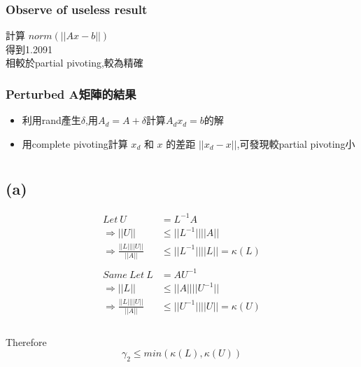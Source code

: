 \documentclass[12pt]{article}
\begin{document}
    \subsubsection*{Observe of useless result}
        計算 $norm(||Ax-b||)$\\
        得到1.2091\\
        相較於partial pivoting,較為精確
    \subsubsection*{Perturbed A矩陣的結果}
        \begin{itemize}
            \item 利用rand產生$\delta$,用$A_d=A+\delta$計算$A_dx_d=b$的解
            \item 用complete pivoting計算 $x_d$ 和 $x$ 的差距 $||x_d - x||$,可發現較partial pivoting小
        \end{itemize}
\section{}
    \subsection*{(a)}
        \begin{equation*}
            \begin{aligned}
            Let\ U&=L^{-1}A \\
\Rightarrow ||U|| &\leq ||L^{-1}||||A||\\
\Rightarrow \frac{||L||||U||}{||A||} &\leq ||L^{-1}||||L|| = \kappa(L)\\
            \\
      Same\ Let\ L&=AU^{-1} \\
\Rightarrow ||L|| &\leq ||A||||U^{-1}||\\
\Rightarrow \frac{||L||||U||}{||A||} &\leq ||U^{-1}||||U|| = \kappa(U)\\
            \end{aligned}       
        \end{equation*}\\
            Therefore
            $$\gamma_2 \leq min(\kappa(L),\kappa(U))$$  
\end{document}
